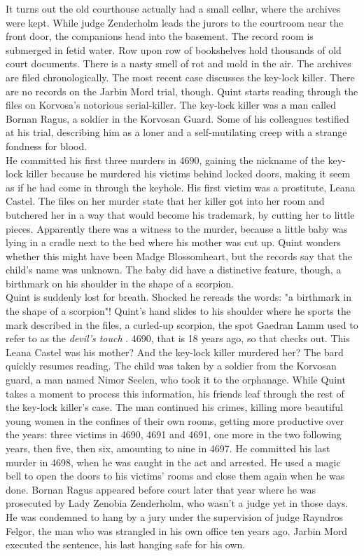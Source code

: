 It turns out the old courthouse actually had a small cellar, where the archives were kept. While judge Zenderholm leads the jurors to the courtroom near the front door, the companions head into the basement. The record room is submerged in fetid water. Row upon row of bookshelves hold thousands of old court documents. There is a nasty smell of rot and mold in the air. The archives are filed chronologically. The most recent case discusses the key-lock killer. There are no records on the Jarbin Mord trial, though. Quint starts reading through the files on Korvosa's notorious serial-killer. The key-lock killer was a man called Bornan Ragus, a soldier in the Korvosan Guard. Some of his colleagues testified at his trial, describing him as a loner and a self-mutilating creep with a strange fondness for blood.\\

He committed his first three murders in 4690, gaining the nickname of the key-lock killer because he murdered his victims behind locked doors, making it seem as if he had come in through the keyhole. His first victim was a prostitute, Leana Castel. The files on her murder state that her killer got into her room and butchered her in a way that would become his trademark, by cutting her to little pieces. Apparently there was a witness to the murder, because a little baby was lying in a cradle next to the bed where his mother was cut up. Quint wonders whether this might have been Madge Blossomheart, but the records say that the child's name was unknown. The baby did have a distinctive feature, though, a birthmark on his shoulder in the shape of a scorpion.\\

Quint is suddenly lost for breath. Shocked he rereads the words: "a birthmark in the shape of a scorpion"! Quint's hand slides to his shoulder where he sports the mark described in the files, a curled-up scorpion, the spot Gaedran Lamm used to refer to as the {\itshape devil's touch} . 4690, that is 18 years ago, so that checks out. This Leana Castel was his mother? And the key-lock killer murdered her? The bard quickly resumes reading. The child was taken by a soldier from the Korvosan guard, a man named Nimor Seelen, who took it to the orphanage. While Quint takes a moment to process this information, his friends leaf through the rest of the key-lock killer's case. The man continued his crimes, killing more beautiful young women in the confines of their own rooms, getting more productive over the years: three victims in 4690, 4691 and 4691, one more in the two following years, then five, then six, amounting to nine in 4697. He committed his last murder in 4698, when he was caught in the act and arrested. He used a magic bell to open the doors to his victims' rooms and close them again when he was done. Bornan Ragus appeared before court later that year where he was prosecuted by Lady Zenobia Zenderholm, who wasn't a judge yet in those days. He was condemned to hang by a jury under the supervision of judge Rayndros Felgor, the man who was strangled in his own office ten years ago. Jarbin Mord executed the sentence, his last hanging safe for his own.\\

